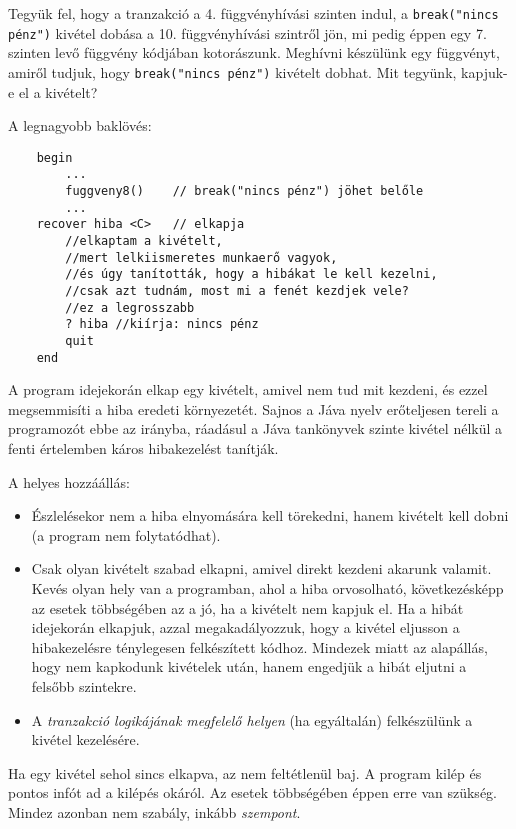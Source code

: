 Tegyük fel, hogy a tranzakció a 4. függvényhívási szinten indul,
a \verb!break("nincs pénz")! kivétel dobása a 10. függvényhívási szintről jön,
mi pedig éppen egy 7. szinten levő függvény kódjában kotorászunk.
Meghívni készülünk egy függvényt, amiről tudjuk, hogy 
\verb!break("nincs pénz")! kivételt dobhat. Mit tegyünk, kapjuk-e el a kivételt?

A legnagyobb baklövés:
\begin{verbatim}
    begin
        ...
        fuggveny8()    // break("nincs pénz") jöhet belőle
        ...
    recover hiba <C>   // elkapja
        //elkaptam a kivételt,
        //mert lelkiismeretes munkaerő vagyok,
        //és úgy tanították, hogy a hibákat le kell kezelni,
        //csak azt tudnám, most mi a fenét kezdjek vele?
        //ez a legrosszabb        
        ? hiba //kiírja: nincs pénz
        quit
    end
\end{verbatim}
A program idejekorán elkap egy kivételt, 
amivel nem tud mit kezdeni, és ezzel megsemmisíti a hiba eredeti környezetét.
Sajnos a Jáva nyelv erőteljesen tereli a programozót ebbe az irányba,
ráadásul a Jáva tankönyvek szinte kivétel nélkül a fenti értelemben
káros hibakezelést tanítják.

A helyes hozzáállás:
\begin{itemize}
 \item 
    Észlelésekor nem a hiba elnyomására kell törekedni, 
    hanem kivételt kell dobni (a program nem folytatódhat).
 \item
    Csak olyan kivételt szabad elkapni, 
        amivel direkt kezdeni akarunk valamit.
    Kevés olyan hely van a programban, 
        ahol a hiba orvosolható, következésképp 
            az esetek többségében az a jó, ha a kivételt nem kapjuk el.
    Ha a hibát idejekorán elkapjuk, azzal megakadályozzuk, 
        hogy a kivétel eljusson a hibakezelésre ténylegesen felkészített kódhoz.
    Mindezek miatt az alapállás, 
        hogy nem kapkodunk kivételek után,
          hanem engedjük a hibát eljutni a felsőbb szintekre.
 \item
   A {\em tranzakció logikájának megfelelő helyen\/} (ha egyáltalán)
   felkészülünk a kivétel kezelésére.
\end{itemize}
Ha egy kivétel sehol sincs elkapva, az nem feltétlenül baj. 
A program kilép és pontos infót ad a kilépés okáról. 
Az esetek többségében éppen erre van szükség.
Mindez azonban nem szabály, inkább {\em szempont}.






